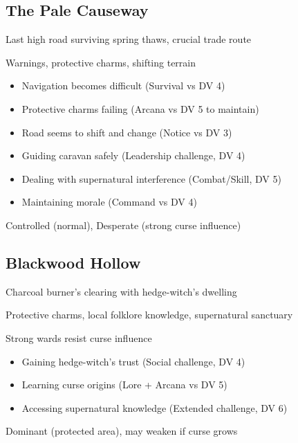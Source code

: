 \documentclass[11pt]{article}
\newenvironment{location}[1]{\begin{description}[leftmargin=*,style=standard]\item[\textbf{#1}]}{\end{description}}
\begin{document}
\subsection{The Pale Causeway}
\begin{location}{The Pale Causeway}
\item[Description:] Last high road surviving spring thaws, crucial trade route
\item[Features:] Warnings, protective charms, shifting terrain
\item[Curse Effects:] 
  \begin{itemize}
    \item Navigation becomes difficult (Survival vs DV 4)
    \item Protective charms failing (Arcana vs DV 5 to maintain)
    \item Road seems to shift and change (Notice vs DV 3)
  \end{itemize}
\item[Challenges:] 
  \begin{itemize}
    \item Guiding caravan safely (Leadership challenge, DV 4)
    \item Dealing with supernatural interference (Combat/Skill, DV 5)
    \item Maintaining morale (Command vs DV 4)
  \end{itemize}
\item[Position:] Controlled (normal), Desperate (strong curse influence)
\end{location}

\subsection{Blackwood Hollow}
\begin{location}{Blackwood Hollow}
\item[Description:] Charcoal burner's clearing with hedge-witch's dwelling
\item[Features:] Protective charms, local folklore knowledge, supernatural sanctuary
\item[Protection:] Strong wards resist curse influence
\item[Challenges:] 
  \begin{itemize}
    \item Gaining hedge-witch's trust (Social challenge, DV 4)
    \item Learning curse origins (Lore + Arcana vs DV 5)
    \item Accessing supernatural knowledge (Extended challenge, DV 6)
  \end{itemize}
\item[Position:] Dominant (protected area), may weaken if curse grows
\end{location}
\end{document}

